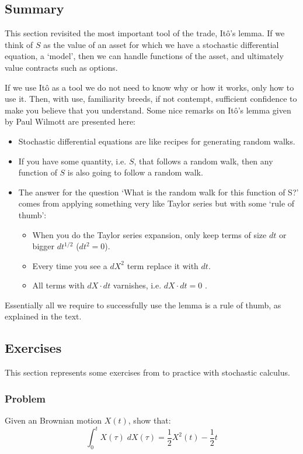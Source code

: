 \subsection{Summary}
This section revisited the most important tool of the trade, Itô's lemma. If we think of $S$ as the value of an asset for which we have a stochastic differential equation, a `model', then we can handle functions of the asset, and ultimately value contracts such as options.

If we use Itô as a tool we do not need to know why or how it works, only how to use it. Then, with use, familiarity breeds, if not contempt, sufficient confidence to make you believe that you understand. Some nice remarks on Itô's lemma given by Paul Wilmott \cite{pw_iqf2ed_2007} are presented here:
\begin{itemize}
    \setlength\itemsep{0em}
    \item Stochastic differential equations are like recipes for generating random walks.
    \item If you have some quantity, i.e. $S$, that follows a random walk, then any function of $S$ is also going to follow a random walk.
    \item The answer for the question `What is the random walk for this function of S?' comes from applying something very like Taylor series but with some `rule of thumb':
    \begin{itemize}
    \setlength\itemsep{0em} 
        \item When you do the Taylor series expansion, only keep terms of size $dt$ or bigger $dt^{1/2}$ ($dt^2 = 0$).
        \item Every time you see a $dX^2$ term replace it with $dt$.
        \item All terms with $dX \cdot dt$ varnishes, i.e. $dX \cdot dt = 0$ .
    \end{itemize}
\end{itemize}  

Essentially all we require to successfully use the lemma is a rule of thumb, as explained in the text.



\subsection{Exercises}
This section represents some exercises from \cite{pw_iqf2ed_2007} to practice with stochastic calculus.


\subsubsection{Problem}
Given an Brownian motion $X(t)$, show that:
\begin{equation}
    \int_0^t X(\tau) \; dX(\tau) = \frac{1}{2} X^2(t) - \frac{1}{2}t
    \nonumber
\end{equation}


